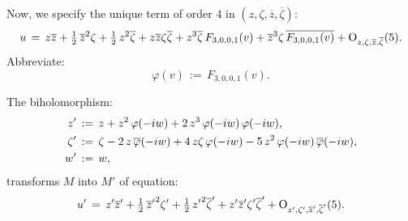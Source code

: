 \documentclass[12pt,twoside,leqno,openany]{amsart}
\begin{document}
\label{normalization-F-3-0-0-1}

Now, we specify the unique term of order $4$ in $(z, \zeta, 
\overline{z}, \overline{\zeta})$:
\[
u
\,=\,
z\overline{z}
+
\tfrac{1}{2}\,
\overline{z}^2\zeta
+
\tfrac{1}{2}\,
z^2\overline{\zeta}
+
z\overline{z}\zeta\overline{\zeta}
+
z^3\overline{\zeta}\,
F_{3,0,0,1}(v)
+
\overline{z}^3\zeta\,
\overline{F_{3,0,0,1}(v)}
+
{\rm O}_{z,\zeta,\overline{z},\overline{\zeta}}(5).
\]
Abbreviate:
\[
\varphi(v)
\,:=\,
F_{3,0,0,1}(v).
\]

\begin{Lemma}
The biholomorphism:
\[
\aligned
z'
&
\,:=\,
z
+
z^2\,\varphi(-iw)
+
2\,z^3\,\varphi(-iw)\,\varphi(-iw),
\\
\zeta'
&
\,:=\,
\zeta
-
2\,z\,\overline{\varphi}(-iw)
+
4\,z\zeta\,
\varphi(-iw)
-
5\,z^2\,\varphi(-iw)\,
\overline{\varphi}(-iw),
\\
w'
&
\,:=\,
w,
\endaligned
\]
transforms $M$ into $M'$ of equation:
\[
u'
\,=\,
z'\overline{z}'
+
\tfrac{1}{2}\,{\overline{z}'}^2\zeta'
+
\tfrac{1}{2}\,{z'}^2\overline{\zeta}'
+
z'\overline{z}'\zeta'\overline{\zeta}'
+
{\rm O}_{z',\zeta',\overline{z}',\overline{\zeta}'}(5).
\]

\end{Lemma}
\end{document}
